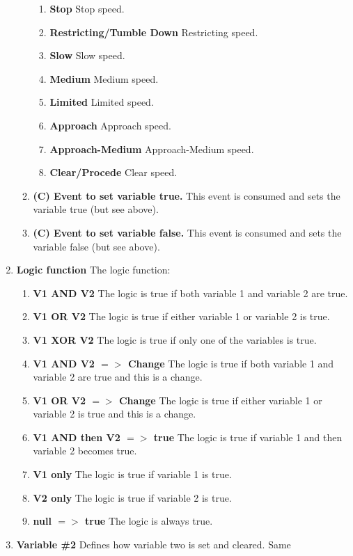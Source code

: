 \begin{enumerate}
\begin{enumerate}
\begin{enumerate}
\item \textbf{Stop} Stop speed.
\item \textbf{Restricting/Tumble Down} Restricting speed.
\item \textbf{Slow} Slow speed.
\item \textbf{Medium} Medium speed.
\item \textbf{Limited} Limited speed.
\item \textbf{Approach} Approach speed.
\item \textbf{Approach-Medium} Approach-Medium speed.
\item \textbf{Clear/Procede} Clear speed.
\end{enumerate}
\item \textbf{(C) Event to set variable true.} This event is consumed and sets 
the variable true (but see above).
\item \textbf{(C) Event to set variable false.} This event is consumed and 
sets
the variable false (but see above).
\end{enumerate}
\item \textbf{Logic function} The logic function:
\begin{enumerate}
\item \textbf{V1 AND V2} The logic is true if both variable 1 and variable 2 
are true.
\item \textbf{V1 OR V2} The logic is true if either variable 1 or variable 2 
is true.
\item \textbf{V1 XOR V2} The logic is true if only one of the variables is 
true.
\item \textbf{V1 AND V2 $=>$ Change} The logic is true if both variable 1 and 
variable 2    
are true and this is a change.
\item \textbf{V1 OR V2 $=>$ Change} The logic is true if either variable 1 or 
variable 2    
is true and this is a change.
\item \textbf{V1 AND then V2 $=>$ true} The logic is true if variable 1 and 
then variable 2 becomes true.
\item \textbf{V1 only} The logic is true if variable 1 is true.
\item \textbf{V2 only} The logic is true if variable 2 is true.
\item \textbf{null $=>$ true} The logic is always true.
\end{enumerate}
\item \textbf{Variable \#2} Defines how variable two is set and cleared. Same 

\end{enumerate}
